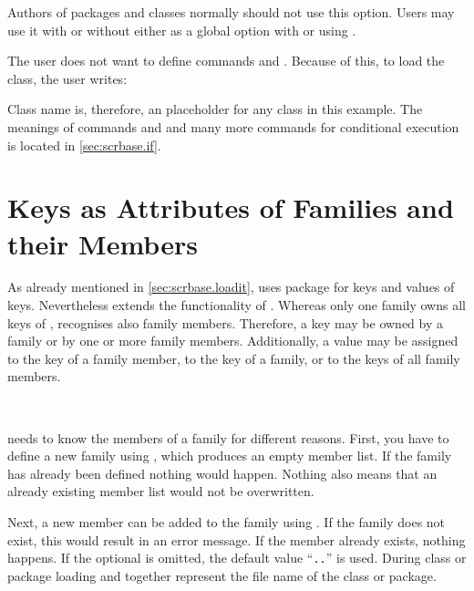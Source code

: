 Authors of packages and classes normally should not use this option. Users may
use it with or without  either as a global option with
 or using .
\begin{Example}
  The user does not want  to define commands 
  and . Because of this, to load the class, the user
  writes:
  Class name  is, therefore, an placeholder
  for any class in this example. The meanings of commands  and
   and many more commands for conditional execution
  is located in \autoref{sec:scrbase.if}.
\end{Example}
%
%


\section{Keys as Attributes of Families and their Members}
\label{sec:scrbase.keyvalue}

As already mentioned in \autoref{sec:scrbase.loadit},  uses
package  for keys and values of keys. Nevertheless
 extends the functionality of . Whereas only
one family owns all keys of ,  recognises
also family members. Therefore, a key may be owned by a family or by one or
more family members. Additionally, a value may be assigned to the key of a
family member, to the key of a family, or to the keys of all family members.

\begin{Declaration}
  \\
\end{Declaration}
%
%
 needs to know the members of a family for different
reasons. First, you have to define a new family using
, which produces an empty member list. If the family
has already been defined nothing would happen. Nothing also means that an
already existing member list would not be overwritten.

Next, a new member can be added to the family using
. If the family does not exist, this would result in
an error message. If the member already exists, nothing happens. If the
optional  is omitted, the default value
``\texttt{.}\texttt{.}'' is used. During
class or package loading  and  together
represent the file name of the class or package.

